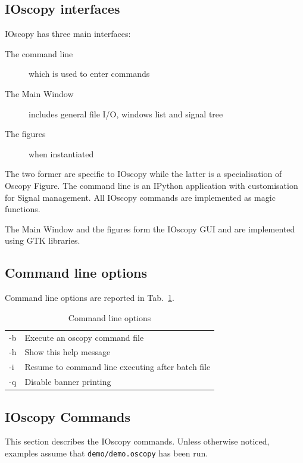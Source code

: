 \documentclass[a4paper,11pt]{article}
\begin{document}
\subsection{IOscopy interfaces}
IOscopy has three main interfaces:
\begin{description}
\item[The command line] which is used to enter commands
\item[The Main Window] includes general file I/O, windows list and signal tree
\item[The figures] when instantiated
\end{description}
The two former are specific to IOscopy while the latter is a specialisation of Oscopy Figure.
The command line is an IPython application with customisation for Signal management.
All IOscopy commands are implemented as magic functions.

The Main Window and the figures form the IOscopy GUI and are implemented using GTK libraries.

\subsection{Command line options}
Command line options are reported in Tab.~\ref{tab:clio}.
\begin{table}[htbp]
  \centering\sf
  \begin{tabular}{ll}
    \hline
   -b&	Execute an oscopy command file\\
   -h&	Show this help message\\
   -i&	Resume to command line executing after batch file\\
   -q&	Disable banner printing\\
   \hline
  \end{tabular}
  \caption{Command line options}
  \label{tab:clio}
\end{table}
\subsection{IOscopy Commands}
This section describes the IOscopy commands. Unless otherwise noticed, examples assume that \texttt{demo/demo.oscopy} has been run.
\end{document}
